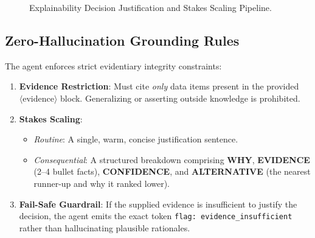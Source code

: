 \documentclass[12pt,a4paper]{article}
\begin{document}
\begin{figure}[htbp]
\centering
{}
\caption{Explainability Decision Justification and Stakes Scaling Pipeline.}
\label{fig:explain_pipeline}
\end{figure}

\subsection{Zero-Hallucination Grounding Rules}
The agent enforces strict evidentiary integrity constraints:
\begin{enumerate}[noitemsep,topsep=2pt]
    \item \textbf{Evidence Restriction}: Must cite \textit{only} data items present in the provided $\langle\text{evidence}\rangle$ block. Generalizing or asserting outside knowledge is prohibited.
    \item \textbf{Stakes Scaling}:
    \begin{itemize}[noitemsep]
        \item \textit{Routine}: A single, warm, concise justification sentence.
        \item \textit{Consequential}: A structured breakdown comprising \textbf{WHY}, \textbf{EVIDENCE} (2--4 bullet facts), \textbf{CONFIDENCE}, and \textbf{ALTERNATIVE} (the nearest runner-up and why it ranked lower).
    \end{itemize}
    \item \textbf{Fail-Safe Guardrail}: If the supplied evidence is insufficient to justify the decision, the agent emits the exact token \texttt{flag: evidence\_insufficient} rather than hallucinating plausible rationales.
\end{enumerate}
\end{document}
